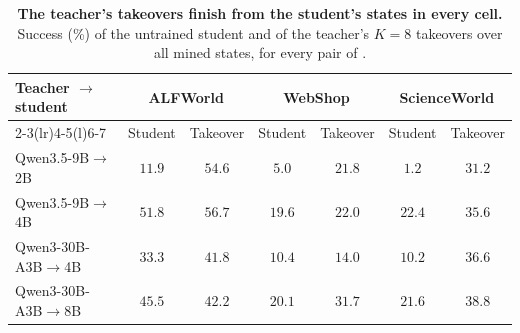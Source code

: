 \begin{table}[t]
\centering
\caption{\textbf{The teacher's takeovers finish from the student's states in every cell.} Success (\%) of the untrained student and of the teacher's $K{=}8$ takeovers over all mined states, for every pair of .}
\label{tab:takeover-all}
\small
\setlength{\tabcolsep}{4.5pt}
\begin{tabular}{@{}lcccccc@{}}
\toprule
\multirow{2}{*}{Teacher $\to$ student} & \multicolumn{2}{c}{ALFWorld} & \multicolumn{2}{c}{WebShop} & \multicolumn{2}{c}{ScienceWorld} \\
\cmidrule(lr){2-3}\cmidrule(lr){4-5}\cmidrule(l){6-7}
 & Student & Takeover & Student & Takeover & Student & Takeover \\
\midrule\midrule
Qwen3.5-9B$\to$2B & $11.9$ & $54.6$ & $5.0$ & $21.8$ & $1.2$ & $31.2$ \\
Qwen3.5-9B$\to$4B & $51.8$ & $56.7$ & $19.6$ & $22.0$ & $22.4$ & $35.6$ \\
Qwen3-30B-A3B$\to$4B & $33.3$ & $41.8$ & $10.4$ & $14.0$ & $10.2$ & $36.6$ \\
Qwen3-30B-A3B$\to$8B & $45.5$ & $42.2$ & $20.1$ & $31.7$ & $21.6$ & $38.8$ \\
\bottomrule
\end{tabular}
\end{table}
